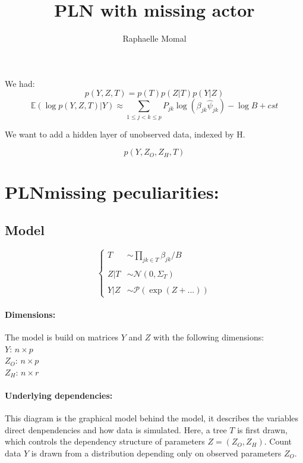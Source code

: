 \documentclass[11pt,a4paper]{article}
\author{Raphaelle Momal}
\title{PLN with missing actor}
\newcommand{\edgeunit}{1.5}
\newcommand{\Esp}{\mathds{E}}
\begin{document}
\maketitle


We had: 
$$ p(Y,Z,T) = p(T)p(Z|T)p(Y|Z)$$
$$ \Esp(\log p(Y,Z,T)|Y) \approx \sum_{1 \leq j < k \leq p} P_{jk} \log\left(\beta_{jk} \hat{\psi}_{jk}\right) - \log B + cst$$

We want to add a hidden layer of unobserved data, indexed by H.

$$ p(Y,Z_O,Z_H,T)$$
\section{PLNmissing peculiarities:}

\subsection{Model}

$$\left\{\begin{array}{rl}
T & \sim\prod_{jk \in T} \beta_{jk}/B \\\\

Z|T& \sim\mathcal{N}(0,\Sigma_T)\\\\

Y|Z&\sim\mathcal{P}( \exp( Z+...) )
\end{array} \right.$$

\paragraph{Dimensions:}
The model is build on matrices $Y$ and $Z$ with the following dimensions:\\
$Y$: $n\times p$\\
$Z_O$: $n\times p$\\
$Z_H$: $n\times r$


\paragraph{Underlying dependencies:} This diagram is the graphical model behind the model, it describes the variables direct denpendencies and how data is simulated. Here, a tree $T$ is first drawn, which controls the dependency structure of parameters $Z = (Z_O,Z_H)$. Count data $Y$ is drawn from a distribution depending only on observed parameters $Z_O$.
\begin{center}
\end{center}
\end{document}
